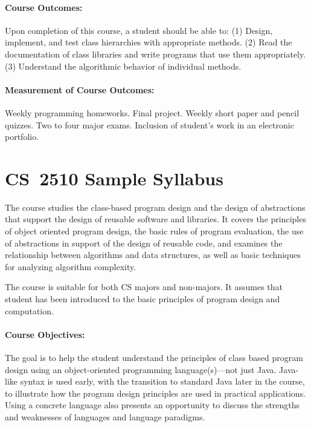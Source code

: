 \documentclass[11pt]{article}
\begin{document}
\paragraph{Course Outcomes:}
%
Upon completion of this course, a student should be able to: 
(1) Design, implement, and test class hierarchies with appropriate methods. 
(2) Read the documentation of class libraries and write programs that use them appropriately. 
(3) Understand the algorithmic behavior of individual methods.

\paragraph{Measurement of Course Outcomes:}
%
Weekly programming homeworks. Final project. Weekly short paper and pencil quizzes. Two to four major exams. Inclusion of student's work in an electronic portfolio.

\section{CS~2510 Sample Syllabus}

The course studies the class-based program design and the design of abstractions that support the design of reusable software and libraries. It covers the principles of object oriented program design, the basic rules of program evaluation, the use of abstractions in support of the design of reusable code, and examines the relationship between algorithms and data structures, as well as basic techniques for analyzing algorithm complexity.

The course is suitable for both CS majors and non-majors. It assumes that student has been introduced to the basic principles of program design and computation.

\paragraph{Course Objectives:}
%
The goal is to help the student understand the principles of class based program design using an object-oriented programming language(s)---not just Java. Java-like syntax is used early, with the transition to standard Java later in the course, to illustrate how the program design principles are used in practical applications. Using a concrete language also presents an opportunity to discuss the strengths and weaknesses of languages and language paradigms.
\end{document}
